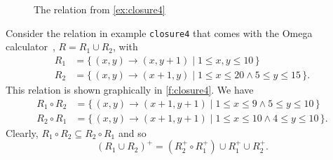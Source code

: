 \begin{figure}
\begin{center}
\end{center}
\caption{The relation from \autoref{ex:closure4}}
\label{f:closure4}
\end{figure}
\begin{example}
\label{ex:closure4}
Consider the relation in example {\tt closure4} that comes with
the Omega calculator~, $R = R_1 \cup R_2$,
with
$$
\begin{aligned}
R_1 & = \{\, (x,y) \to (x,y+1) \mid 1 \le x,y \le 10 \,\}
\\
R_2 & = \{\, (x,y) \to (x+1,y) \mid 1 \le x \le 20 \wedge 5 \le y \le 15 \,\}
.
\end{aligned}
$$
This relation is shown graphically in \autoref{f:closure4}.
We have
$$
\begin{aligned}
R_1 \circ R_2 &=
\{\, (x,y) \to (x+1,y+1) \mid 1 \le x \le 9 \wedge 5 \le y \le 10 \,\}
\\
R_2 \circ R_1 &=
\{\, (x,y) \to (x+1,y+1) \mid 1 \le x \le 10 \wedge 4 \le y \le 10 \,\}
.
\end{aligned}
$$
Clearly, $R_1 \circ R_2 \subseteq R_2 \circ R_1$ and so
$$
\left(
R_1 \cup R_2
\right)^+
=
\left(R_2^+ \circ R_1^+\right)
\cup R_1^+
\cup R_2^+
.
$$
\end{example}

